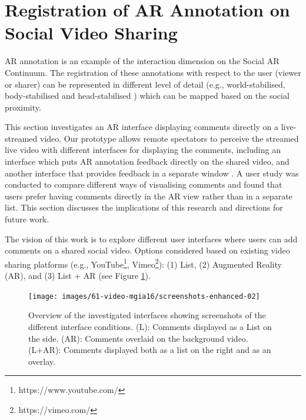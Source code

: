 \section{Registration of AR Annotation on Social Video Sharing}
\label{sec:video}

AR annotation is an example of the interaction dimension on the Social AR Continuum. The registration of these annotations with respect to the user (viewer or sharer) can be represented in different level of detail (e.g., world-stabilised, body-stabilised and head-stabilised \cite{Billinghurst1998}) which can be mapped based on the social proximity. 

This section investigates an AR interface displaying comments directly on a live-streamed video. Our prototype allows remote spectators to perceive the streamed live video with different interfaces for displaying the comments, including an interface which puts AR annotation feedback directly on the shared video, and another interface that provides feedback in a separate window \cite{Nassani2016}. A user study was conducted to compare different ways of visualising comments and found that users prefer having comments directly in the AR view rather than in a separate list. This section discusses the implications of this research and directions for future work.



The vision of this work is to explore different user interfaces where users can add comments on a shared social video. Options considered based on existing video sharing platforms (e.g., YouTube\footnote{https://www.youtube.com/}, Vimeo\footnote{https://vimeo.com/}): (1) List, (2) Augmented Reality (AR), and (3) List + AR (see Figure \ref{fig:mgia16:conditions}).

\begin{figure}
  \texttt{[image: images/61-video-mgia16/screenshots-enhanced-02]}
  \caption{Overview of the investigated interfaces showing screenshots of the different interface conditions. (L): Comments displayed as a List on the side. (AR): Comments overlaid on the background video. (L+AR): Comments displayed both as a list on the right and as an overlay. }
  \label{fig:mgia16:conditions}
\end{figure}

